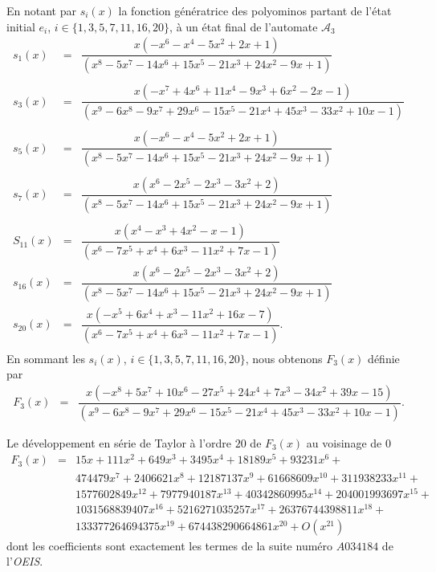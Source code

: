 En notant par $s_{i}(x)$ la fonction génératrice des polyominos partant de l'état initial $e_{i}$, $i\in \{1, 3, 5, 7, 11, 16, 20\}$, à un état final de l'automate $\mathcal{A}_{3}$ 
\begin{eqnarray*}
s_1(x) &=& \dfrac{x(-x^{6} - x^{4} - 5x^{2} + 2x + 1)}{(x^{8} - 5x^{7} - 14x^{6} + 15x^{5} - 21x^{3} + 24x^{2} - 9x + 1)}\\
& &\\
s_3(x) &=& \dfrac{x(-x^{7} + 4x^{6} + 11x^{4} - 9x^{3} + 6x^{2} - 2x - 1)}{(x^{9} - 6x^{8} - 9x^{7} + 29x^{6} - 15x^{5} - 21x^{4} + 45x^{3} - 33x^{2} + 10x - 1)} \\
& &\\
s_5(x) &=& \dfrac{ x(-x^{6} - x^{4} - 5x^{2} + 2x + 1)}{(x^{8} - 5x^{7} - 14x^{6} + 15x^{5} - 21x^{3} + 24x^{2} - 9x + 1)}\\
& &\\
s_7(x) &=& \dfrac{x(x^{6} - 2x^{5} - 2x^{3} - 3x^{2} + 2)}{(x^{8} - 5x^{7} - 14x^{6} + 15x^{5} - 21x^{3} + 24x^{2} - 9x + 1)}\\
& &\\
S_{11}(x) &=& \dfrac{x(x^{4} - x^{3} + 4x^{2} - x - 1)}{(x^{6} - 7x^{5} + x^{4} + 6x^{3} - 11x^{2} + 7x - 1)}\\
s_{16}(x) &=& \dfrac{ x(x^{6} - 2x^{5} - 2x^{3} - 3x^{2} + 2)}{(x^{8} - 5x^{7} - 14x^{6} + 15x^{5} - 21x^{3} + 24x^{2} - 9x + 1)}\\
s_{20}(x) &=& \dfrac{x(-x^{5} + 6x^{4} + x^{3} - 11x^{2} + 16x - 7)}{(x^{6} - 7x^{5} + x^{4} + 6x^{3} - 11x^{2} + 7x - 1)}.\\
\end{eqnarray*}
En sommant les $s_{i}(x)$,  $i\in \{1, 3, 5, 7, 11, 16, 20\}$, nous obtenons $F_{3}(x)$ définie par
\begin{eqnarray*}
F_3(x) &=&\dfrac{x(-x^{8} + 5x^{7} + 10x^{6} - 27x^{5} + 24x^{4} + 7x^{3} - 34x^{2} + 39x - 15)}{(x^{9} - 6x^{8} - 9x^{7} + 29x^{6} - 15x^{5} - 21x^{4} + 45x^{3} - 33x^{2} + 10x - 1)}.
\end{eqnarray*}
 
Le développement en série de Taylor à l'ordre $20$ de $F_{3}(x)$ au voisinage de $0$
\begin{eqnarray*}
F_{3}(x) &=&15x+111x^{2}+649x^{3}+3495x^{4}+18189x^{5}+93231x^{6}+\\
& & 474479x^{7}+2406621x^{8}+12187137x^{9}+61668609x^{10}+311938233x^{11}+\\
& & 1577602849x^{12}+7977940187x^{13}+40342860995x^{14}+204001993697x^{15}+\\
& & 1031568839407x^{16}+5216271035257x^{17}+26376744398811x^{18}+\\
& & 133377264694375x^{19}+674438290664861x^{20}+O(x^{21})
\end{eqnarray*}
dont les coefficients sont exactement les termes de la suite numéro  $A034184$  de l'\emph{OEIS}.



